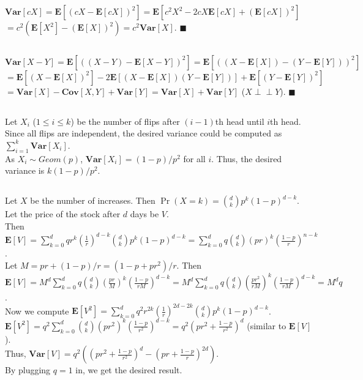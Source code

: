 \documentclass{article}
\begin{document}
\subsection{}
$\textbf{Var}[cX]=\textbf{E}[(cX-\textbf{E}[cX])^2]=\textbf{E}[c^2X^2 - 2cX\textbf{E}[cX]+(\textbf{E}[cX])^2]$\\
$=c^2(\textbf{E}[X^2] - (\textbf{E}[X])^2)=c^2\textbf{Var}[X]$. $\blacksquare$
\subsection{}
$\textbf{Var}[X-Y]=\textbf{E}[((X-Y)-\textbf{E}[X-Y])^2]=\textbf{E}[((X-\textbf{E}[X])-(Y-\textbf{E}[Y]))^2]$\\
$=\textbf{E}[(X-\textbf{E}[X])^2] - 2\textbf{E}[(X-\textbf{E}[X])(Y-\textbf{E}[Y])]+\textbf{E}[(Y-\textbf{E}[Y])^2]$\\
$=\textbf{Var}[X]-\textbf{Cov}[X,Y]+\textbf{Var}[Y]=\textbf{Var}[X]+\textbf{Var}[Y]$ ($X \perp\!\!\!\perp Y$). $\blacksquare$
\subsection{}
Let $X_i$ ($1 \leq i \leq k$) be the number of flips after $(i-1)$th head until $i$th head.
Since all flips are independent, the desired variance could be computed as $\sum\limits_{i=1}^k \textbf{Var}[X_i]$.\\
As $X_i\sim Geom(p)$, $\textbf{Var}[X_i]=(1-p)/p^2$ for all $i$. Thus, the desired variance is $k(1-p)/p^2$.
\subsection{}
Let $X$ be the number of increases. Then $\Pr(X=k)=\binom{d}{k}p^k(1-p)^{d-k}$.\\
Let the price of the stock after $d$ days be $V$.\\
Then $\textbf{E}[V]=\sum\limits_{k=0}^d qr^k(\frac{1}{r})^{d-k}\binom{d}{k}p^k(1-p)^{d-k}=\sum\limits_{k=0}^dq\binom{d}{k}(pr)^k(\frac{1-p}{r})^{n-k}$.\\
Let $M=pr + (1-p)/r = (1-p+pr^2)/r$. Then\\
$\textbf{E}[V]=M^d\sum\limits_{k=0}^dq\binom{d}{k}(\frac{pr}{M})^k(\frac{1-p}{rM})^{d-k}=M^d\sum\limits_{k=0}^dq\binom{d}{k}(\frac{pr^2}{rM})^k(\frac{1-p}{rM})^{d-k}=M^dq$.\\
Now we compute $\textbf{E}[V^2]=\sum\limits_{k=0}^dq^2 r^{2k}(\frac{1}{r})^{2d-2k}\binom{d}{k}p^k(1-p)^{d-k}$.\\
$\textbf{E}[V^2]=q^2\sum\limits_{k=0}^d\binom{d}{k}(pr^2)^k(\frac{1-p}{r^2})^{d-k}=q^2\left(pr^2+\frac{1-p}{r^2} \right)^d$ (similar to $\textbf{E}[V]$).\\
Thus, $\textbf{Var}[V]=q^2 \left((pr^2 + \frac{1-p}{r^2})^d - (pr + \frac{1-p}{r})^{2d}\right)$.\\
By plugging $q=1$ in, we get the desired result.
\end{document}
